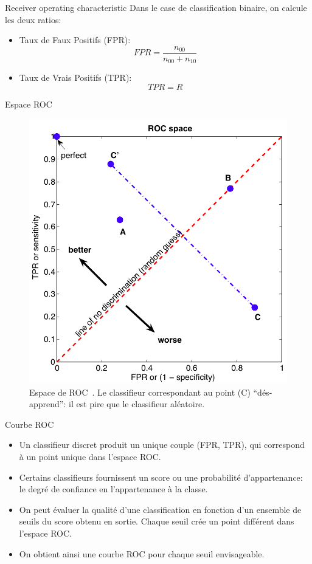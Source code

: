 \documentclass[8pt]{beamer}
\begin{document}
			\begin{frame}{Receiver operating characteristic}
				Dans le case de classification binaire, on calcule les deux ratios:
				\begin{itemize}
					\item<1-> Taux de Faux Positifs (FPR):
						\begin{equation}
							FPR = \frac{n_{00}}{n_{00} + n_{10}}
						\end{equation}
					\item<2-> Taux de Vrais Positifs (TPR):
						\begin{equation}
							TPR = R
						\end{equation}
				\end{itemize}
			\end{frame}
			\begin{frame}{Espace ROC}
				\begin{figure}[H]
					\includegraphics[width=.45\textwidth]{images/samples/roc.png}
					\caption*{Espace de ROC~\cite{schrynemackers2009using}. Le classifieur correspondant au point (C) ``dés-apprend'': il est pire que le classifieur aléatoire.}
				\end{figure}
			\end{frame}
			\begin{frame}{Courbe ROC}
				\begin{itemize}
					\item<1-> Un classifieur discret produit un unique couple (FPR, TPR), qui correspond à un point unique dans l’espace ROC.
					\item<2-> Certains classifieurs fournissent un score ou une probabilité d’appartenance: le degré de confiance en l’appartenance à la classe.
					\item<3-> On peut évaluer la qualité d'une classification en fonction d'un ensemble de seuils du score obtenu en sortie. Chaque seuil crée un point différent dans l'espace ROC.
					\item<4-> On obtient ainsi une courbe ROC pour chaque seuil envisageable.
				\end{itemize}
			\end{frame}
\end{document}
